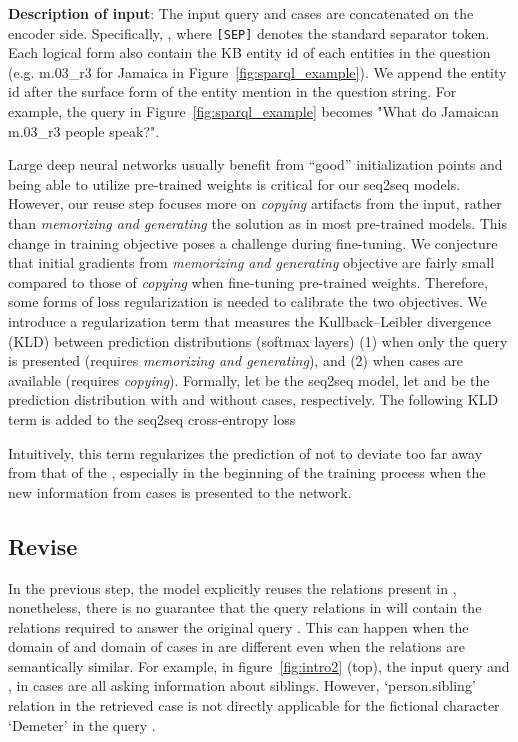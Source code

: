 \documentclass{article}
\begin{document}
\textbf{Description of input}: The input query  and cases  are concatenated on the encoder side. Specifically, , where \texttt{[SEP]} denotes the standard separator token. Each logical form also contain the KB entity id of each entities in the question (e.g. m.03\_r3 for Jamaica in Figure~\ref{fig:sparql_example}). We append the entity id after the surface form of the entity mention in the question string. For example, the query in Figure~\ref{fig:sparql_example} becomes "What do Jamaican m.03\_r3 people speak?".


Large deep neural networks usually benefit from ``good'' initialization points \citep{frankle2019lottery} and being able to utilize pre-trained weights is critical for our seq2seq models. 
However, our reuse step focuses more on \textit{copying} artifacts from the input, rather than \textit{memorizing and generating} the solution as in most pre-trained models. 
This change in training objective poses a challenge during fine-tuning. 
We conjecture that initial gradients from \textit{memorizing and generating} objective are fairly small compared to those of \textit{copying} when fine-tuning pre-trained weights. Therefore, some forms of loss regularization is needed to calibrate the two objectives. 
We introduce a regularization term that measures the Kullback–Leibler divergence (KLD) between prediction distributions (softmax layers) (1) when only the query  is presented (requires \textit{memorizing and generating}), and (2) when cases  are available (requires \textit{copying}).
Formally, let  be the seq2seq model, let  and  be the prediction distribution with and without cases, respectively. The following KLD term is added to the seq2seq cross-entropy loss

Intuitively, this term regularizes the prediction of  not to deviate too far away from that of the , especially in the beginning of the training process when the new information from cases  is presented to the network.



\subsection{Revise}
\label{sub:revise}
In the previous step, the model explicitly reuses the relations present in , nonetheless, there is no guarantee that the query relations in  will contain the relations required to answer the original query . 
This can happen when the domain of  and domain of cases in  are different even when  the relations are semantically similar.  For example, in figure~\ref{fig:intro2} (top), the input query  and ,  in cases are all asking information about siblings. However, `\textsf{person.sibling}' relation in the retrieved case is not directly applicable for the fictional character `Demeter’ in the query . 
\end{document}
